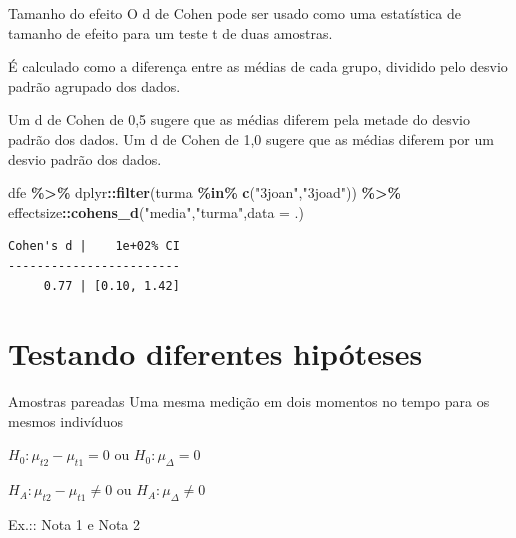 \documentclass[
  9pt,
  ignorenonframetext,
  aspectratio=169]{beamer}
\newenvironment{Shaded}{\begin{snugshade}}{\end{snugshade}}
\newcommand{\DataTypeTok}[1]{\textcolor[rgb]{0.13,0.29,0.53}{#1}}
\newcommand{\KeywordTok}[1]{\textcolor[rgb]{0.13,0.29,0.53}{\textbf{#1}}}
\newcommand{\NormalTok}[1]{#1}
\newcommand{\OperatorTok}[1]{\textcolor[rgb]{0.81,0.36,0.00}{\textbf{#1}}}
\newcommand{\StringTok}[1]{\textcolor[rgb]{0.31,0.60,0.02}{#1}}
\begin{document}
\begin{frame}[fragile]{Tamanho do efeito}
\protect\hypertarget{tamanho-do-efeito}{}
O d de Cohen pode ser usado como uma estatística de tamanho de efeito
para um teste t de duas amostras.

É calculado como a diferença entre as médias de cada grupo, dividido
pelo desvio padrão agrupado dos dados.

Um d de Cohen de 0,5 sugere que as médias diferem pela metade do desvio
padrão dos dados. Um d de Cohen de 1,0 sugere que as médias diferem por
um desvio padrão dos dados.

\begin{Shaded}
\begin{Highlighting}[]
\NormalTok{dfe }\OperatorTok{\%\textgreater{}\%}\StringTok{ }\NormalTok{dplyr}\OperatorTok{::}\KeywordTok{filter}\NormalTok{(turma }\OperatorTok{\%in\%}\StringTok{ }\KeywordTok{c}\NormalTok{(}\StringTok{"3joan"}\NormalTok{,}\StringTok{"3joad"}\NormalTok{)) }\OperatorTok{\%\textgreater{}\%}
\StringTok{  }\NormalTok{effectsize}\OperatorTok{::}\KeywordTok{cohens\_d}\NormalTok{(}\StringTok{"media"}\NormalTok{,}\StringTok{"turma"}\NormalTok{,}\DataTypeTok{data =}\NormalTok{ .)}
\end{Highlighting}
\end{Shaded}

\begin{verbatim}
Cohen's d |    1e+02% CI
------------------------
     0.77 | [0.10, 1.42]
\end{verbatim}
\end{frame}

\hypertarget{testando-diferentes-hipuxf3teses}{%
\section{Testando diferentes
hipóteses}\label{testando-diferentes-hipuxf3teses}}

\begin{frame}{Amostras pareadas}
\protect\hypertarget{amostras-pareadas}{}
Uma mesma medição em dois momentos no tempo para os mesmos indivíduos

\(H_0:\mu_{t2}-\mu_{t1}=0\) ou \(H_0:\mu_{\Delta}=0\)

\(H_A:\mu_{t2}-\mu_{t1}\neq0\) ou \(H_A:\mu_{\Delta}\neq0\)

Ex.:: Nota 1 e Nota 2
\end{frame}
\end{document}
